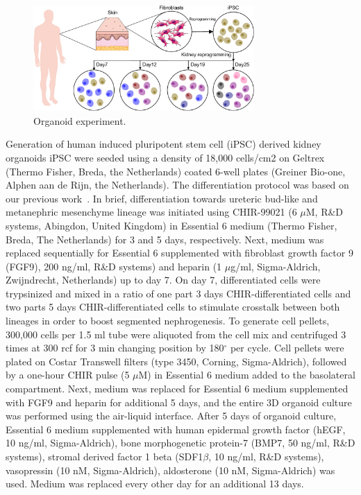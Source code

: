 \begin{figure}[!ht]
	\centering
	\includegraphics[width=0.75\textwidth]{Organoid_exp/fig}
	\vspace{0.1cm}
	\caption[Organoid experiment]{Organoid experiment.}
	\label{fig:organoid_exp}
\end{figure}

Generation of human induced pluripotent stem cell (iPSC) derived kidney organoids iPSC were seeded using a density of 18,000 cells/cm2 on Geltrex (Thermo Fisher, Breda, the Netherlands) coated 6-well plates (Greiner Bio-one, Alphen aan de Rijn, the Netherlands). The differentiation protocol was based on our previous work~\citep{jansen2022sars}. In brief, differentiation towards ureteric bud-like and metanephric mesenchyme lineage was initiated using CHIR-99021 (6 $\mu$M, R\&D systems, Abingdon, United Kingdom) in Essential 6 medium (Thermo Fisher, Breda, The Netherlands) for 3 and 5 days, respectively. Next, medium was  replaced sequentially for Essential 6 supplemented with fibroblast growth factor 9 (FGF9), 200 ng/ml, R\&D systems) and heparin (1 $\mu$g/ml, Sigma-Aldrich, Zwijndrecht, Netherlands) up to day 7. On day 7, differentiated cells were trypsinized and mixed in a ratio of one part 3 days CHIR-differentiated cells and two parts 5 days CHIR-differentiated cells to stimulate crosstalk between both lineages in order to boost segmented nephrogenesis. To generate cell pellets, 300,000 cells per 1.5 ml tube were aliquoted from the cell mix and centrifuged 3 times at 300 rcf for 3 min changing position by 180$^\circ$ per cycle. Cell pellets were plated on Costar Transwell filters (type 3450, Corning, Sigma-Aldrich), followed by a one-hour CHIR pulse (5 $\mu$M) in Essential 6 medium added to the basolateral compartment. Next, medium was replaced for Essential 6 medium supplemented with FGF9 and heparin for additional 5 days, and the entire 3D organoid culture was performed using the air-liquid interface. After 5 days of organoid culture, Essential 6 medium supplemented with human epidermal growth factor (hEGF, 10 ng/ml, Sigma-Aldrich), bone morphogenetic protein-7 (BMP7, 50 ng/ml, R\&D systems), stromal derived factor 1 beta (SDF1$\beta$, 10 ng/ml, R\&D systems), vasopressin (10 nM, Sigma-Aldrich), aldosterone (10 nM, Sigma-Aldrich) was used. Medium was replaced every other day for an additional 13 days. 

